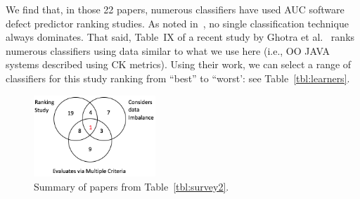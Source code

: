 \documentclass[sigconf,review, anonymous]{acmart}
\theoremstyle{break}
\theoremstyle{break}
\newcommand{\sma}{{\sc SMOTE}}
\newcommand{\smb}{{\sc SMOTUNED}}
\begin{document}
We find that, in those 22 papers,
numerous classifiers have used AUC software defect
predictor ranking studies.  
As
 noted in~\cite{lessmann2008benchmarking, ghotra2015revisiting},  no single classification technique always dominates.  
 That said, Table~IX of a recent study by Ghotra et al.~\cite{ghotra2015revisiting}
 ranks numerous classifiers  using data similar
 to what we use here (i.e., OO JAVA systems described using CK metrics).
 Using their work, we can select
 a range of classifiers  for this study
 ranking from ``best''
 to ``worst': see Table~\ref{tbl:learners}.
 
 \begin{figure}
  \centering
  \captionsetup{justification=centering}
  \includegraphics[width=1.8in]{venn.png}
  \caption{Summary of papers from Table~\ref{tbl:survey2}.}
\label{fig:s2}
\end{figure}

 


\end{document}
